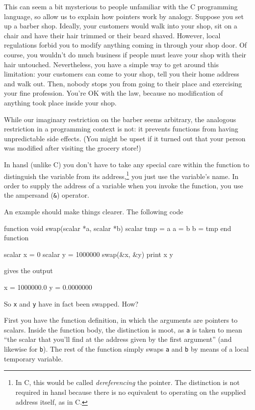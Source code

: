 This can seem a bit mysterious to people unfamiliar with the C
programming language, so allow us to explain how pointers work by
analogy. Suppose you set up a barber shop. Ideally, your customers
would walk into your shop, sit on a chair and have their hair trimmed
or their beard shaved. However, local regulations forbid you to modify
anything coming in through your shop door. Of course, you wouldn't do
much business if people must leave your shop with their hair
untouched. Nevertheless, you have a simple way to get around this
limitation: your customers can come to your shop, tell you their home
address and walk out. Then, nobody stops you from going to their place
and exercising your fine profession. You're OK with the law, because
no modification of anything took place inside your shop.

While our imaginary restriction on the barber seems arbitrary, the
analogous restriction in a programming context is not: it prevents
functions from having unpredictable side effects. (You might be upset
if it turned out that your person was modified after visiting the
grocery store!)

In hansl (unlike C) you don't have to take any special care within the
function to distinguish the variable from its address,\footnote{In C,
  this would be called \emph{dereferencing} the pointer. The
  distinction is not required in hansl because there is no equivalent
  to operating on the supplied address itself, as in C.} you just use
the variable's name.  In order to supply the address of a variable
when you invoke the function, you use the ampersand (\verb|&|)
operator.

An example should make things clearer. The following code
\begin{code}
function void swap(scalar *a, scalar *b)
    scalar tmp = a
    a = b
    b = tmp
end function

scalar x = 0
scalar y = 1000000
swap(&x, &y)
print x y
\end{code}
gives the output
\begin{code}
              x =  1000000.0
              y =  0.0000000
\end{code}
So \texttt{x} and \texttt{y} have in fact been swapped. How?

First you have the function definition, in which the arguments are
pointers to scalars. Inside the function body, the distinction is
moot, as \verb|a| is taken to mean ``the scalar that you'll find at
the address given by the first argument'' (and likewise for
\verb|b|). The rest of the function simply swaps \texttt{a} and
\texttt{b} by means of a local temporary variable.

